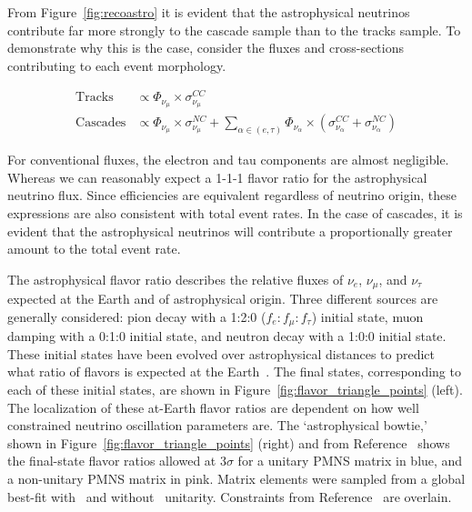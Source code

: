 \documentclass[main.tex]{subfiles}
\begin{document}
From Figure~\ref{fig:recoastro} it is evident that the astrophysical neutrinos contribute far more strongly to the cascade sample than to the tracks sample.
To demonstrate why this is the case, consider the fluxes and cross-sections contributing to each event morphology.

\begin{align}
    \text{Tracks} &\propto \Phi_{\nu_{\mu}}\times \sigma_{\nu_{\mu}}^{CC} \\
    \text{Cascades} &\propto \Phi_{\nu_{\mu}}\times \sigma_{\nu_{\mu}}^{NC}  + \sum_{\alpha\in (e,\tau)}\Phi_{\nu_{\alpha}}\times\left( \sigma_{\nu_{\alpha}}^{CC} +  \sigma_{\nu_{\alpha}}^{NC}\right)
\end{align}

For conventional fluxes, the electron and tau components are almost negligible. 
Whereas we can reasonably expect a 1-1-1 flavor ratio for the astrophysical neutrino flux. 
Since efficiencies are equivalent regardless of neutrino origin, these expressions are also consistent with total event rates. 
In the case of cascades, it is evident that the astrophysical neutrinos will contribute a proportionally greater amount to the total event rate. 


The astrophysical flavor ratio describes the relative fluxes of $\nu_{e}$, $\nu_{\mu}$, and $\nu_{\tau}$ expected at the Earth and of astrophysical origin. 
Three different sources are generally considered: pion decay with a 1:2:0 ($f_{e}:f_{\mu}:f_{\tau}$) initial state, muon damping with a 0:1:0 initial state, and neutron decay with a 1:0:0 initial state. 
These initial states have been evolved over astrophysical distances to predict what ratio of flavors is expected at the Earth~\cite{Pakvasa_2008}. 
The final states, corresponding to each of these initial states, are shown in Figure~\ref{fig:flavor_triangle_points} (left). 
The localization of these at-Earth flavor ratios are dependent on how well constrained neutrino oscillation parameters are. 
The `astrophysical bowtie,' shown in Figure~\ref{fig:flavor_triangle_points} (right) and from Reference~\cite{Arg_elles_2020_astrotime} shows the final-state flavor ratios allowed at $3\sigma$ for a unitary PMNS matrix in blue, and a non-unitary PMNS matrix in pink. 
Matrix elements were sampled from a global best-fit with~\cite{Esteban_2019} and without~\cite{Parke_2016_nonunitity} unitarity. 
Constraints from Reference~\cite{Aartsen_2015_astro_flav} are overlain. 
\end{document}
